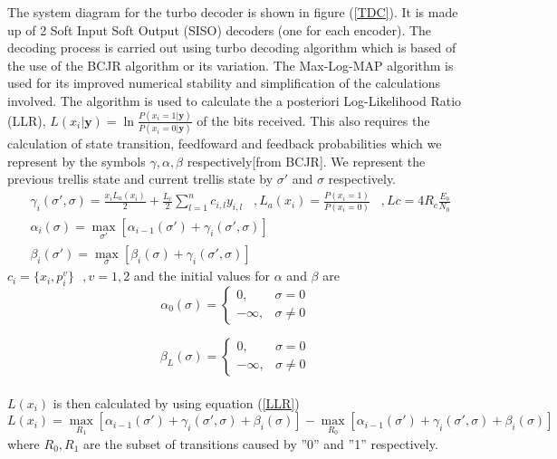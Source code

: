 \documentclass[20 pts]{article}
\begin{document}
 
 The system diagram for the turbo decoder is shown in figure (\ref{TDC}). It is made up of 2
 Soft Input Soft Output (SISO) decoders (one for each encoder). The decoding 
 process is carried out using turbo decoding algorithm which is based of the use of
 the BCJR algorithm or its variation.  The Max-Log-MAP algorithm is used 
 for its improved numerical stability and simplification of the calculations involved. 
 The algorithm is used to calculate the a posteriori Log-Likelihood Ratio (LLR),  
 $L(x_i|\mathbf{y})=\ln \frac{P(x_i=1|\mathbf{y})}{P(x_i=0|\mathbf{y})}$ 
 of the bits received. This also requires
 the calculation of state transition, feedfoward and feedback probabilities which we
 represent by the symbols $\gamma,\alpha, \beta $ respectively[from BCJR]. We 
 represent the previous trellis state and current trellis state by $\sigma'$ and $\sigma$ 
 respectively.
\begin{equation}
\begin{split}
&\gamma_i(\sigma',\sigma)=
\frac{x_i L_a (x_i)}{2}+
\frac{L_c}{2}\sum_{l=1}^{n} c_{i,l}y_{i,l}\,\,\,\,\, ,L_a(x_i) =\frac{P(x_i=1)}{P(x_i=0)}
\,\,\,\,\, ,Lc=4R_c\frac{E_b}{N_0}\\
&\alpha_i(\sigma)=\max_{\sigma'}[\alpha_{i-1}(\sigma')+\gamma_i(\sigma',\sigma)]\\
&\beta_i(\sigma')=\max_{\sigma}[\beta_{i}(\sigma)+\gamma_i(\sigma',\sigma)]
\end{split}
\label{abc}
\end{equation}
$c_i=\{x_i,p^{v}_i\}\,\,\,\, ,v=1,2$ and the initial values for $\alpha$ and $\beta$ are
\[
    \alpha_0(\sigma)= 
\begin{cases}
   0,& \sigma= 0\\        -\infty,              &  \sigma \neq 0
\end{cases}
\]

\[
   \beta_L(\sigma)= 
\begin{cases}
   0,& \sigma= 0\\        -\infty,              &  \sigma \neq 0
\end{cases}
\]
 \paragraph{}
$ L(x_i)$ is then calculated by using equation (\ref{LLR})
 \begin{equation}
 L(x_i)=\max_{R_1}[\alpha_{i-1}(\sigma')+ \gamma_i(\sigma',\sigma)+\beta_i(\sigma)]
 -
 \max_{R_0}[\alpha_{i-1}(\sigma')+ \gamma_i(\sigma',\sigma)+\beta_i(\sigma)]
\label{LLR}
\end{equation}
where $R_0,R_1$ are the subset of transitions caused by ''0'' and ''1'' respectively.
\end{document}
